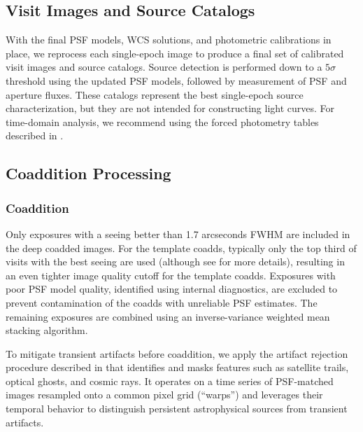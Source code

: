 \subsection{Visit Images and Source Catalogs}
\label{sssec:visit_images_source_catalogs}
With the final \gls{PSF} models, \gls{WCS} solutions, and photometric calibrations in place, we reprocess each single-epoch image to produce a final set of calibrated visit images and source catalogs.
Source detection is performed down to a $5\sigma$ threshold using the updated \gls{PSF} models, followed by measurement of \gls{PSF} and aperture fluxes.
These catalogs represent the best single-\gls{epoch} source characterization, but they are not intended for constructing light curves.
For time-domain analysis, we recommend using the \gls{forced photometry} tables described in .

\subsection{Coaddition Processing}
\label{ssec:coadd_processing}
\subsubsection{Coaddition}
\label{ssec:coaddition}
Only exposures with a \gls{seeing} better than 1.7 arcseconds FWHM are included in the deep coadded images. For the template coadds, typically only the top third of visits with the best \gls{seeing} are used (although see  for more details), resulting in an even tighter image quality cutoff for the template coadds. Exposures with poor \gls{PSF} model quality, identified using internal diagnostics, are excluded to prevent contamination of the coadds with unreliable \gls{PSF} estimates. The remaining exposures are combined using an inverse-variance weighted mean stacking \gls{algorithm}.

To mitigate transient artifacts before coaddition, we apply the artifact rejection procedure described in \cite{dmtn-080} that identifies and masks features such as satellite trails, optical ghosts, and cosmic rays.
It operates on a time series of \gls{PSF}-matched images resampled onto a common pixel grid (``warps'') and leverages their temporal behavior to distinguish persistent astrophysical sources from transient artifacts.

